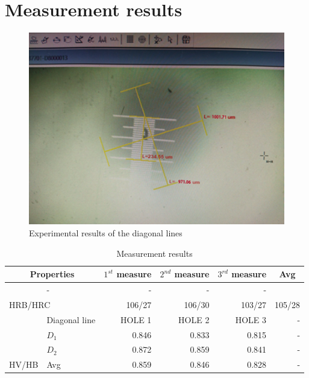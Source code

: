 \section{Measurement results}
\begin{figure}[ht]
	\centering
	\includegraphics[width=150mm]{109267072_710156266492754_8636426261719016576_n.png}
	\caption{Experimental results of the diagonal lines}
	\label{1}
\end{figure}
\begin{table}[ht]
	\centering
	\renewcommand{\arraystretch}{1.5}
	\begin{tabular}{llrrrr}
		\toprule
		\multicolumn{2}{c}{Properties}                   &$ 1^{st} $ measure  & \multicolumn{1}{c}{$ 2^{nd} $ measure} & \multicolumn{1}{c}{$ 3^{rd} $ measure} & \multicolumn{1}{c}{Avg} \\ \midrule
		\rowcolor{lightgray!20}\multicolumn{2}{l}{\cellcolor[HTML]{C0C0C0}HRA }&- {\color[HTML]{C0C0C0} } &-  & - &- \\ 
		\multicolumn{2}{l}{\cellcolor[HTML]{C0C0C0}HRB/HRC} &106/27   & 106/30 & 103/27 & 105/28 \\ 
		\rowcolor{lightgray!20}\cellcolor[HTML]{C0C0C0} & Diagonal line \cellcolor[HTML]{EFEFEF} & HOLE 1 & HOLE 2 & HOLE 3 & - \\  
		\cellcolor[HTML]{C0C0C0} & \cellcolor[HTML]{EFEFEF} $ D_1 $ & 0.846 & 0.833& 0.815 & -\\  
		\rowcolor{lightgray!20}{\cellcolor[HTML]{C0C0C0} } & \cellcolor[HTML]{EFEFEF} $ D_2 $ & 0.872 & 0.859 & 0.841 & -\\  
		\multirow{-4}{*}{\cellcolor[HTML]{C0C0C0}HV/HB } & \cellcolor[HTML]{EFEFEF}Avg  &   0.859                      &          0.846               &    0.828        & -             \\ \hline
	\end{tabular}
	\caption{Measurement results}
	\label{3}
\end{table}


